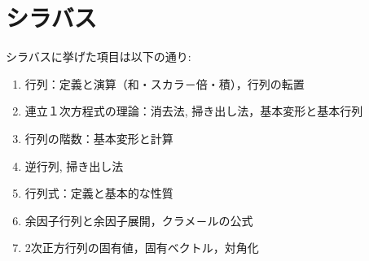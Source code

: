




\section{シラバス}
シラバスに挙げた項目は以下の通り:
\begin{enumerate}
\item
  行列：定義と演算（和・スカラ－倍・積），行列の転置
\item
  連立１次方程式の理論：消去法, 掃き出し法，基本変形と基本行列
\item
  行列の階数：基本変形と計算
\item
  逆行列, 掃き出し法
\item
  行列式：定義と基本的な性質
\item
  余因子行列と余因子展開，クラメ－ルの公式
\item
  2次正方行列の固有値，固有ベクトル，対角化
\end{enumerate}

